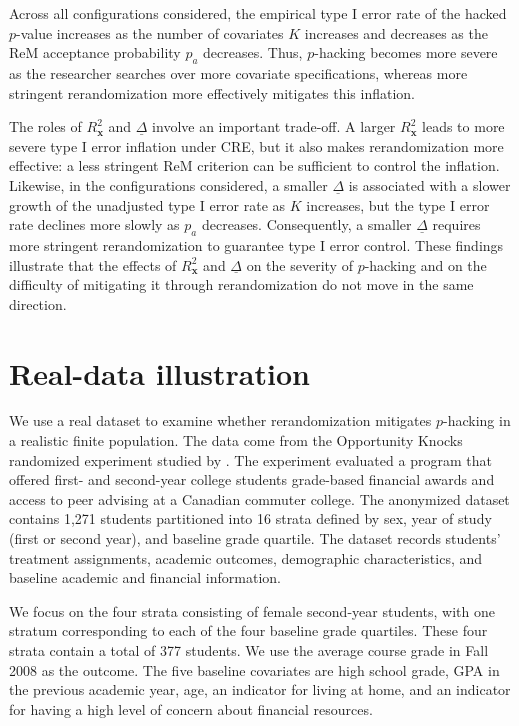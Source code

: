 \documentclass[12pt]{article}
\newcommand{\bs}{\boldsymbol}
\newcommand{\lx}[1]{#1}
\begin{document}
Across all configurations considered, the empirical type I error rate of
the hacked $p$-value increases as the number of covariates $K$ increases
and decreases as the ReM acceptance probability $p_a$ decreases. Thus,
$p$-hacking becomes more severe as the researcher searches over more
covariate specifications, whereas more stringent rerandomization
more effectively mitigates this inflation.

The roles of $R^2_{\bs{x}}$ and $\underline{\Delta}$ involve an important
trade-off. A larger $R^2_{\bs{x}}$ leads to more severe type I error
inflation under CRE, but it also makes rerandomization more effective:
a less stringent ReM criterion can be sufficient to control the inflation.
Likewise, in the configurations considered, a smaller
$\underline{\Delta}$ is associated with a slower growth of the unadjusted
type I error rate as $K$ increases, but the type I error rate declines more
slowly as $p_a$ decreases. Consequently, a smaller
$\underline{\Delta}$ requires more stringent rerandomization to guarantee type I error control. These findings illustrate that the effects of $R^2_{\bs{x}}$ and
$\underline{\Delta}$ on the severity of $p$-hacking and on the difficulty
of mitigating it through rerandomization do not move in the same
direction.

\section{\lx{Real-data illustration}}
\label{sec:real-data}

We use a real dataset to examine whether rerandomization mitigates
$p$-hacking in a realistic finite population. The data come from the
Opportunity Knocks randomized experiment studied by
\citet{angrist2014opportunity}. The experiment evaluated a program that offered
first- and second-year college students grade-based financial awards and
access to peer advising at a Canadian commuter college. The anonymized
dataset contains 1,271 students partitioned into 16 strata
defined by sex, year of study (first or second year), and baseline grade
quartile. The dataset records students' treatment assignments, academic
outcomes, demographic characteristics, and baseline academic and
financial information.

We focus on the four strata consisting of female second-year students, with one stratum corresponding to each of the four
baseline grade quartiles. These four strata contain a total of 377
students. We use the average course grade in Fall 2008 as the outcome. The five
baseline covariates are high school grade, GPA in the previous academic
year, age, an indicator for living at home, and an indicator for having
a high level of concern about financial resources. 
\end{document}
